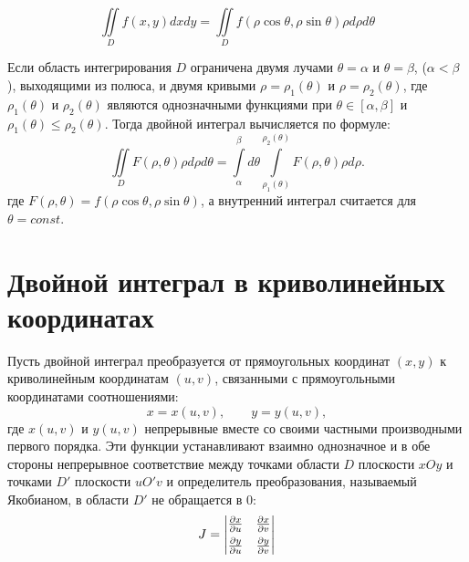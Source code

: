 \documentclass[a4paper,12pt,oneside]{extbook}
\theoremstyle{numbered}
\theoremstyle{unnumbered}
\theoremstyle{named}
\theoremstyle{unnumbered}
\theoremstyle{named}
\theoremstyle{named}
\theoremstyle{named}
\begin{document}
\begin{equation}
    \iint\limits_{D} f(x, y)dxdy = \iint\limits_{D} f(\rho \cos{\theta}, \rho \sin{\theta}) \rho d\rho d\theta
\end{equation}

Если область интегрирования \(D\) ограничена двумя лучами \(\theta = \alpha\) и \(\theta = \beta\), (\(\alpha < \beta\)), выходящими из полюса, и двумя кривыми \(\rho = \rho_1(\theta)\) и \(\rho = \rho_2(\theta)\), где \(\rho_1(\theta)\) и \(\rho_2(\theta)\) являются однозначными функциями при \(\theta \in [\alpha, \beta]\) и \(\rho_1(\theta) \leq \rho_2(\theta)\). Тогда двойной интеграл вычисляется по формуле:
\begin{equation}
    \iint\limits_{D} F(\rho, \theta) \rho d\rho d\theta = \int\limits_{\alpha}^{\beta} d\theta \int\limits_{\rho_1(\theta)}^{\rho_2(\theta)} F(\rho, \theta) \rho d\rho.
\end{equation}
где \(F(\rho, \theta) = f(\rho \cos{\theta}, \rho \sin{\theta})\), а внутренний интеграл считается для \(\theta = const\).

\section{Двойной интеграл в криволинейных координатах}
\label{sec:Двойной интеграл в криволинейных координатах}

Пусть двойной интеграл преобразуется от прямоугольных координат \((x, y)\) к криволинейным координатам \((u, v)\), связанными с прямоугольными координатами соотношениями:
\begin{equation}
    x = x(u, v), \qquad y = y(u, v),
\end{equation}
где \(x(u, v)\) и \(y(u, v)\) непрерывные вместе со своими частными производными первого порядка. Эти функции устанавливают взаимно однозначное и в обе стороны непрерывное соответствие между точками области \(D\) плоскости \(xOy\) и точками \(D'\) плоскости \(uO'v\) и определитель преобразования, называемый Якобианом, в области \(D'\) не обращается в \(0\):
\begin{equation}
    J =
    \begin{vmatrix}
        \frac{\partial x}{\partial u} & \frac{\partial x}{\partial v}
        \vspace{4pt}                                                  \\
        \frac{\partial y}{\partial u} & \frac{\partial y}{\partial v}
    \end{vmatrix}
\end{equation}
\end{document}
